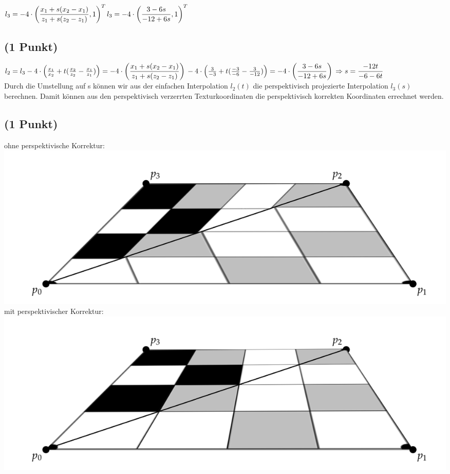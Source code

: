 \documentclass[a4paper,10pt,DIV=14]{article}
\begin{document}
$
l_3 = -4 \cdot \left( \dfrac{x_1 + s (x_2 - x_1)}{z_1 + s(z_2 - z_1)}, 1\right)^T\\
l_3 = -4 \cdot \left( \dfrac{3 - 6s}{-12 + 6s}, 1\right)^T
$

\subsection{(1 Punkt)}

$
l_2 = l_3\\
-4 \cdot \left( \frac{x_1}{x_2} + t(\frac{x_2}{z_2} - \frac{x_1}{z_1}) \right) = -4 \cdot \left( \dfrac{x_1 + s (x_2 - x_1)}{z_1 + s (z_2 - z_1)}\right)\\
-4 \cdot \left( \frac{3}{-3} + t(\frac{-3}{-6} - \frac{3}{-12}) \right) = -4 \cdot \left( \dfrac{3 - 6s }{-12 + 6s}\right)\\
\Rightarrow s = \dfrac{-12t}{-6 -6t}
$\\

Durch die Umstellung auf s können wir aus der einfachen Interpolation $l_2(t)$ die perspektivisch projezierte Interpolation $l_3(s)$ berechnen. Damit können aus den perspektivisch verzerrten Texturkoordinaten die perspektivisch korrekten Koordinaten errechnet werden. 

\subsection{(1 Punkt)}

ohne perspektivische Korrektur:\\
\includegraphics[scale = .2]{3d_2}\\

mit perspektivischer Korrektur: \\
\includegraphics[scale= .2]{3d_1}
\end{document}

